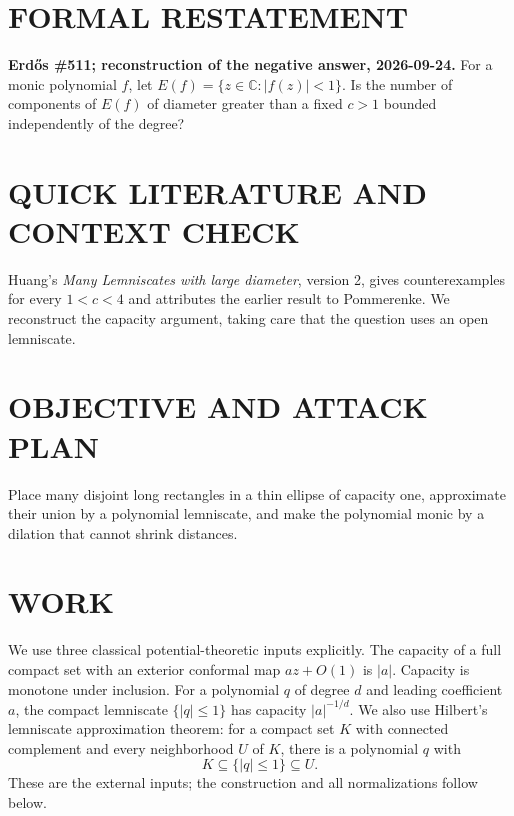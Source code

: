 \section{FORMAL RESTATEMENT}
\textbf{Erd\H{o}s \#511; reconstruction of the negative answer, 2026-09-24.}
For a monic polynomial $f$, let $E(f)=\{z\in\mathbb C:|f(z)|<1\}$. Is the number of components of $E(f)$ of diameter greater than a fixed $c>1$ bounded independently of the degree?

\section{QUICK LITERATURE AND CONTEXT CHECK}
Huang's \emph{Many Lemniscates with large diameter}, version 2, gives counterexamples for every $1<c<4$ and attributes the earlier result to Pommerenke. We reconstruct the capacity argument, taking care that the question uses an open lemniscate.

\section{OBJECTIVE AND ATTACK PLAN}
Place many disjoint long rectangles in a thin ellipse of capacity one, approximate their union by a polynomial lemniscate, and make the polynomial monic by a dilation that cannot shrink distances.

\section{WORK}
We use three classical potential-theoretic inputs explicitly. The capacity of a full compact set with an exterior conformal map $az+O(1)$ is $|a|$. Capacity is monotone under inclusion. For a polynomial $q$ of degree $d$ and leading coefficient $a$, the compact lemniscate $\{|q|\leq1\}$ has capacity $|a|^{-1/d}$. We also use Hilbert's lemniscate approximation theorem: for a compact set $K$ with connected complement and every neighborhood $U$ of $K$, there is a polynomial $q$ with
\[
 K\subseteq\{|q|\leq1\}\subseteq U.
\]
These are the external inputs; the construction and all normalizations follow below.

